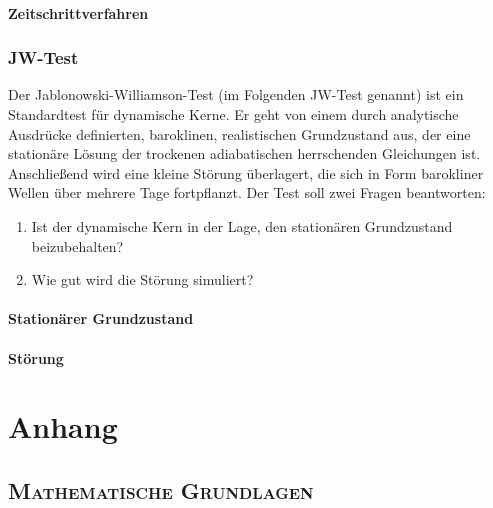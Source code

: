 \documentclass{book}
\begin{document}
\subsection{Zeitschrittverfahren}
\label{sec:zeitschrittverfahren!zusammensetzung_der_prognostischen_gleichungen}

\section{JW-Test}
\label{sec:jw-test}

Der Jablonowski-Williamson-Test \cite{jablonowski} (im Folgenden JW-Test genannt) ist ein Standardtest für dynamische Kerne. Er geht von einem durch analytische Ausdrücke definierten, baroklinen, realistischen Grundzustand aus, der eine stationäre Lösung der trockenen adiabatischen herrschenden Gleichungen ist. Anschließend wird eine kleine Störung überlagert, die sich in Form barokliner Wellen über mehrere Tage fortpflanzt. Der Test soll zwei Fragen beantworten:
%
\begin{enumerate}
\item Ist der dynamische Kern in der Lage, den stationären Grundzustand beizubehalten?
\item Wie gut wird die Störung simuliert?
\end{enumerate}
%
\subsection{Stationärer Grundzustand}
\label{sec:stationaerer_grundzustand}

\subsection{Störung}
\label{sec:stoerung}

\part{Anhang}
\label{part:anhang}

\appendix

\chapter{\normalfont\textsc{Mathematische Grundlagen}}
\label{chap:mathematische_grundlagen}
\end{document}
